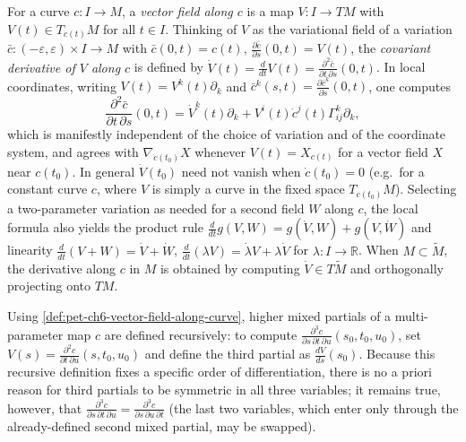 \begin{definition}
  \label{def:pet-ch6-vector-field-along-curve}
  \leanok
  For a curve $c:I\to M$, a \emph{vector field along $c$} is a map $V:I\to TM$
  with $V(t)\in T_{c(t)}M$ for all $t\in I$. Thinking of $V$ as the variational
  field of a variation $\bar c:(-\varepsilon,\varepsilon)\times I\to M$ with
  $\bar c(0,t)=c(t)$, $\frac{\partial\bar c}{\partial s}(0,t)=V(t)$, the
  \emph{covariant derivative of $V$ along $c$} is defined by
  $\dot V(t)=\frac{d}{dt}V(t)=\frac{\partial^2\bar c}{\partial t\,\partial s}(0,t)$.
  In local coordinates, writing $V(t)=V^k(t)\partial_k$ and
  $\bar c^k(s,t)=\tfrac{\partial\bar c^k}{\partial s}(0,t)$, one computes
  \[
    \frac{\partial^2\bar c}{\partial t\,\partial s}(0,t)
    =\dot V^k(t)\partial_k+V^i(t)\dot c^j(t)\Gamma^k_{ij}\partial_k,
  \]
  which is manifestly independent of the choice of variation and of the
  coordinate system, and agrees with $\nabla_{\dot c(t_0)}X$ whenever
  $V(t)=X_{c(t)}$ for a vector field $X$ near $c(t_0)$. In general $\dot V(t_0)$
  need not vanish when $\dot c(t_0)=0$ (e.g.\ for a constant curve $c$, where $V$
  is simply a curve in the fixed space $T_{c(t_0)}M$). Selecting a two-parameter
  variation as needed for a second field $W$ along $c$, the local formula also
  yields the product rule $\frac{d}{dt}g(V,W)=g(\dot V,W)+g(V,\dot W)$ and
  linearity $\frac{d}{dt}(V+W)=\dot V+\dot W$,
  $\frac{d}{dt}(\lambda V)=\dot\lambda V+\lambda\dot V$ for $\lambda:I\to\mathbb{R}$.
  When $M\subset\tilde M$, the derivative along $c$ in $M$ is obtained by
  computing $\dot V\in T\tilde M$ and orthogonally projecting onto $TM$.
\end{definition}

\begin{definition}
  \label{def:pet-ch6-higher-order-partials}
  \leanok
  Using \cref{def:pet-ch6-vector-field-along-curve}, higher mixed partials of a
  multi-parameter map $c$ are defined recursively: to compute
  $\frac{\partial^3c}{\partial s\,\partial t\,\partial u}(s_0,t_0,u_0)$, set
  $V(s)=\frac{\partial^2c}{\partial t\,\partial u}(s,t_0,u_0)$ and define the
  third partial as $\frac{dV}{ds}(s_0)$. Because this recursive definition fixes
  a specific order of differentiation, there is no a priori reason for third
  partials to be symmetric in all three variables; it remains true, however,
  that $\frac{\partial^3c}{\partial s\,\partial t\,\partial u}
  =\frac{\partial^3c}{\partial s\,\partial u\,\partial t}$ (the last two
  variables, which enter only through the already-defined second mixed
  partial, may be swapped).
\end{definition}

